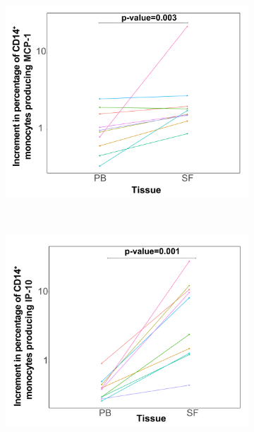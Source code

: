 \begin{figure}[H]
\begin{subfigure}[b]{0.40\textwidth}
\centering
\includegraphics[width=\textwidth]{./Results3/pdfs/CyTOF_validation_cohort_CCL2_percentage_log10_scale}
\caption{}
\end{subfigure}%
~
\begin{subfigure}[b]{0.40\textwidth} 
\centering
\includegraphics[width=\textwidth]{./Results3/pdfs/CyTOF_validation_cohort_IP10_percentage_log10_scale}
\caption{}
\end{subfigure}
~
\begin{subfigure}[b]{0.65\textwidth} 
\centering

\end{subfigure}
\end{figure}
